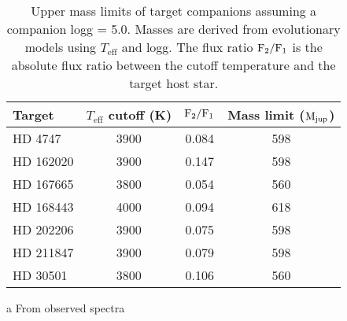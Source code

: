 \begin{table}
    \begin{threeparttable}
        \centering
        \caption{Upper mass limits of target companions assuming a companion logg = 5.0. Masses are derived from \citet{baraffe_new_2015} evolutionary models using  \(T_{\textrm{eff}}\) and logg. The flux ratio \(\rm F_2/F_1\) is the absolute flux ratio between the cutoff temperature and the target host star.}
        \begin{tabular}{l c c c}
            \toprule
            Target & \(T_{\textrm{eff}}\) cutoff (K) & \(\rm F_2/F_1\) & Mass limit ($\rm M_{jup}$)\\
            \midrule
            {HD 4747}     &  3900 & 0.084 & 598\\ 
            {HD 162020} & 3900 & 0.147 & 598\\
            {HD 167665} & 3800 & 0.054 & 560\\
            {HD 168443} & 4000 & 0.094 & 618\\
            {HD 202206} & 3900 & 0.075 & 598\\
            {HD 211847} & 3900 & 0.079 & 598 \\
            {HD 30501}   & 3800\tnote{a} & 0.106 & 560\\
            \bottomrule
        \end{tabular}
        \begin{tablenotes}
                \item [a] {From observed spectra}
        \end{tablenotes}
    \end{threeparttable}
    \label{tab:mass_limits}
\end{table}

